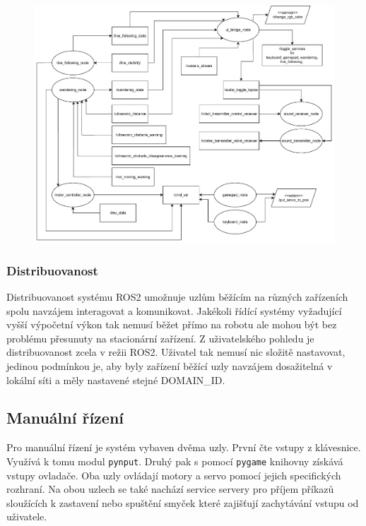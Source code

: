 \begin{figure}[h!]
	\centering
	\includegraphics[scale=0.5]{obrazky-figures/controller_nodes.pdf}
	\caption{}
	\label{}
\end{figure}

\subsubsection{Distribuovanost}
Distribuovanost systému ROS2 umožnuje uzlům běžícím na různých zařízeních spolu navzájem interagovat a komunikovat. Jakékoli řídící systémy vyžadující vyšší výpočetní výkon tak nemusí běžet přímo na robotu ale mohou být bez problému přesunuty na stacionární zařízení. Z uživatelského pohledu je distribuovanost zcela v režii ROS2. Uživatel tak nemusí nic složitě nastavovat, jedinou podmínkou je, aby byly zařízení běžící uzly navzájem dosažitelná v lokální síti a měly nastavené stejné DOMAIN\_ID.

\subsection*{Manuální řízení}
Pro manuální řízení je systém vybaven dvěma uzly. První čte vstupy z klávesnice. Využívá k tomu modul \verb|pynput|. Druhý pak s pomocí \verb|pygame| knihovny získává vstupy ovladače. Oba uzly ovládají motory a servo pomocí jejich specifických rozhraní. Na obou uzlech se také nachází service servery pro příjem příkazů sloužících k zastavení nebo spuštění smyček které zajišťují zachytávání vstupu od uživatele.

